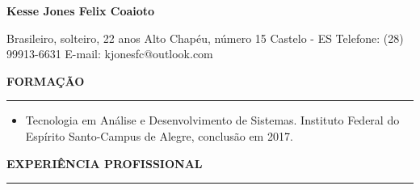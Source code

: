 \documentclass[a4paper,10pt]{article}
\begin{document}

\begin{flushleft}
    \begin{huge}
        \textbf{Kesse Jones Felix Coaioto}
    \end{huge}
\end{flushleft}

\begin{flushleft}
    Brasileiro, solteiro, 22 anos
    \newline
    Alto Chap\'{e}u, n\'{u}mero 15
    \newline
    Castelo - ES
    \newline
    Telefone: (28) 99913-6631
    \newline
    E-mail: kjonesfc@outlook.com
    \newline
\end{flushleft}

\begin{flushleft}
\textbf{FORMA\c{C}\~{A}O}
\noindent\textcolor{gray}{\rule{18cm}{1px}}
\end{flushleft}

\begin{flushleft}
\begin{itemize}
    \item Tecnologia em An\'{a}lise e Desenvolvimento de Sistemas. Instituto Federal do Esp\'{i}rito Santo-Campus de Alegre, conclus\~{a}o em 2017.
    \newline
\end{itemize}
\end{flushleft}

\begin{flushleft}
\textbf{EXPERI\^{E}NCIA PROFISSIONAL}
\noindent\textcolor{gray}{\rule{18cm}{1px}}
\end{flushleft}
\end{document}
